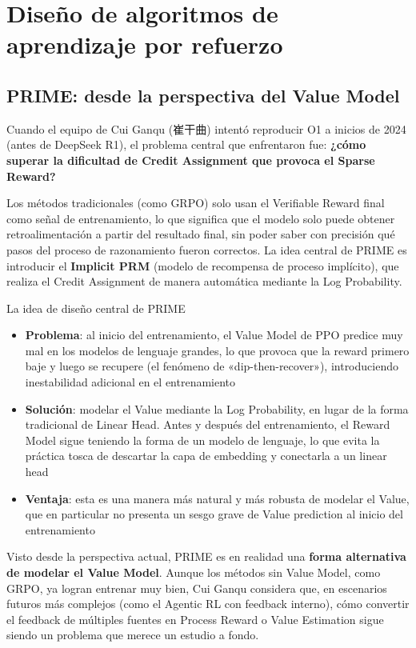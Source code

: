 \documentclass[a4paper]{article}
\begin{document}
\section{Diseño de algoritmos de aprendizaje por refuerzo}

\subsection{PRIME: desde la perspectiva del Value Model}

Cuando el equipo de Cui Ganqu (崔干曲) intentó reproducir O1 a inicios de 2024 (antes de DeepSeek R1), el problema central que enfrentaron fue: \textbf{¿cómo superar la dificultad de Credit Assignment que provoca el Sparse Reward?}

Los métodos tradicionales (como GRPO) solo usan el Verifiable Reward final como señal de entrenamiento, lo que significa que el modelo solo puede obtener retroalimentación a partir del resultado final, sin poder saber con precisión qué pasos del proceso de razonamiento fueron correctos. La idea central de PRIME es introducir el \textbf{Implicit PRM} (modelo de recompensa de proceso implícito), que realiza el Credit Assignment de manera automática mediante la Log Probability.

\begin{importantbox}{La idea de diseño central de PRIME}
\begin{itemize}
    \item \textbf{Problema}: al inicio del entrenamiento, el Value Model de PPO predice muy mal en los modelos de lenguaje grandes, lo que provoca que la reward primero baje y luego se recupere (el fenómeno de «dip-then-recover»), introduciendo inestabilidad adicional en el entrenamiento
    \item \textbf{Solución}: modelar el Value mediante la Log Probability, en lugar de la forma tradicional de Linear Head. Antes y después del entrenamiento, el Reward Model sigue teniendo la forma de un modelo de lenguaje, lo que evita la práctica tosca de descartar la capa de embedding y conectarla a un linear head
    \item \textbf{Ventaja}: esta es una manera más natural y más robusta de modelar el Value, que en particular no presenta un sesgo grave de Value prediction al inicio del entrenamiento
\end{itemize}
\end{importantbox}

Visto desde la perspectiva actual, PRIME es en realidad una \textbf{forma alternativa de modelar el Value Model}. Aunque los métodos sin Value Model, como GRPO, ya logran entrenar muy bien, Cui Ganqu considera que, en escenarios futuros más complejos (como el Agentic RL con feedback interno), cómo convertir el feedback de múltiples fuentes en Process Reward o Value Estimation sigue siendo un problema que merece un estudio a fondo.
\end{document}
